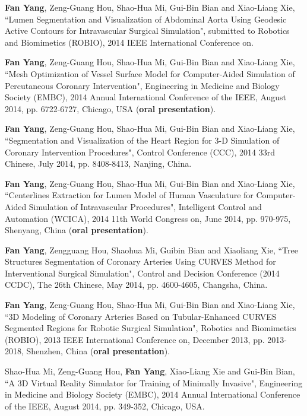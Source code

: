 
\begin{publications}{99}

\item \textbf{Fan Yang}, Zeng-Guang Hou, Shao-Hua Mi, Gui-Bin Bian and Xiao-Liang Xie, ``Lumen Segmentation and Visualization of Abdominal Aorta Using Geodesic Active Contours for Intravascular Surgical Simulation", submitted to Robotics and Biomimetics (ROBIO), 2014 IEEE International Conference on.%

\item \textbf{Fan Yang}, Zeng-Guang Hou, Shao-Hua Mi, Gui-Bin Bian and Xiao-Liang Xie, ``Mesh Optimization of Vessel Surface Model for Computer-Aided Simulation of Percutaneous Coronary Intervention", Engineering in Medicine and Biology Society (EMBC), 2014 Annual International Conference of the IEEE, August 2014, pp. 6722-6727, Chicago, USA (\textbf{oral presentation}).%

\item \textbf{Fan Yang}, Zeng-Guang Hou, Shao-Hua Mi, Gui-Bin Bian and Xiao-Liang Xie, ``Segmentation and Visualization of the Heart Region for 3-D Simulation of Coronary Intervention Procedures", Control Conference (CCC), 2014 33rd Chinese, July 2014, pp. 8408-8413, Nanjing, China.%

\item \textbf{Fan Yang}, Zeng-Guang Hou, Shao-Hua Mi, Gui-Bin Bian and Xiao-Liang Xie, ``Centerlines Extraction for Lumen Model of Human Vasculature for Computer-Aided Simulation of Intravascular Procedures", Intelligent Control and Automation (WCICA), 2014 11th World Congress on, June 2014, pp. 970-975, Shenyang, China (\textbf{oral presentation}).%

\item \textbf{Fan Yang}, Zengguang Hou, Shaohua Mi, Guibin Bian and Xiaoliang Xie, ``Tree Structures Segmentation of Coronary Arteries Using CURVES Method for Interventional Surgical Simulation", Control and Decision Conference (2014 CCDC), The 26th Chinese, May 2014, pp. 4600-4605, Changsha, China.%

\item \textbf{Fan Yang}, Zeng-Guang Hou, Shao-Hua Mi, Gui-Bin Bian and Xiao-Liang Xie, ``3D Modeling of Coronary Arteries Based on Tubular-Enhanced CURVES Segmented Regions for Robotic Surgical Simulation", Robotics and Biomimetics (ROBIO), 2013 IEEE International Conference on, December 2013, pp. 2013-2018, Shenzhen, China (\textbf{oral presentation}).%

\item Shao-Hua Mi, Zeng-Guang Hou, \textbf{Fan Yang}, Xiao-Liang Xie and Gui-Bin Bian, ``A 3D Virtual Reality Simulator for Training of Minimally Invasive", Engineering in Medicine and Biology Society (EMBC), 2014 Annual International Conference of the IEEE, August 2014, pp. 349-352, Chicago, USA.%


\end{publications}

